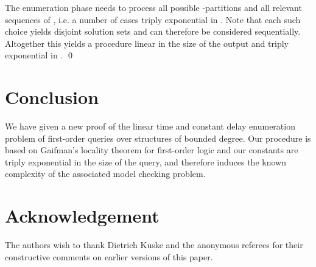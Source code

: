 \documentclass{LMCS}
\begin{document}
 The enumeration phase needs to process all possible -partitions  and all
 relevant sequences of , i.e. a number of cases triply
 exponential in . Note that each such choice yields disjoint solution
 sets and can therefore be considered sequentially. Altogether this yields a
 procedure linear in the size of the output and triply exponential in . \qed

\section{Conclusion}

We have given a new proof of the linear time and constant delay
enumeration problem of first-order queries over structures of bounded
degree.  Our procedure is based on Gaifman's locality theorem for
first-order logic and our constants are triply exponential in the size
of the query, and therefore induces the known complexity of the
associated model checking problem.

\section*{Acknowledgement}
The authors wish to thank Dietrich Kuske and the anonymous referees for their
constructive comments on earlier versions of this paper.



\end{document}
